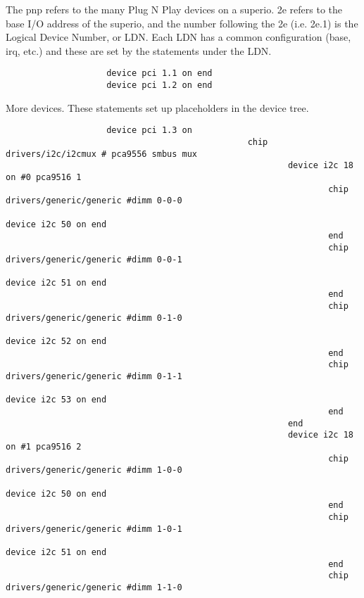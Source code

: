 \documentclass[10pt,letterpaper]{article}
\begin{document}
The pnp refers to the many Plug N Play devices on a superio. 2e refers to the base I/O address of the superio, and the number following the 
2e (i.e. 2e.1) is the Logical Device Number, or LDN. Each LDN has a common configuration (base, irq, etc.) and these are set by the statements under the LDN. 
\begin{verbatim}
					device pci 1.1 on end
					device pci 1.2 on end
\end{verbatim}
More devices. These statements set up placeholders in the device tree. 
\begin{verbatim}
					device pci 1.3 on
                                                chip drivers/i2c/i2cmux # pca9556 smbus mux
                                                        device i2c 18 on #0 pca9516 1
                                                                chip drivers/generic/generic #dimm 0-0-0
                                                                        device i2c 50 on end
                                                                end
                                                                chip drivers/generic/generic #dimm 0-0-1
                                                                        device i2c 51 on end
                                                                end
                                                                chip drivers/generic/generic #dimm 0-1-0
                                                                        device i2c 52 on end
                                                                end
                                                                chip drivers/generic/generic #dimm 0-1-1
                                                                        device i2c 53 on end
                                                                end
                                                        end
                                                        device i2c 18 on #1 pca9516 2
                                                                chip drivers/generic/generic #dimm 1-0-0
                                                                        device i2c 50 on end
                                                                end
                                                                chip drivers/generic/generic #dimm 1-0-1
                                                                        device i2c 51 on end
                                                                end
                                                                chip drivers/generic/generic #dimm 1-1-0

\end{verbatim}
\end{document}
